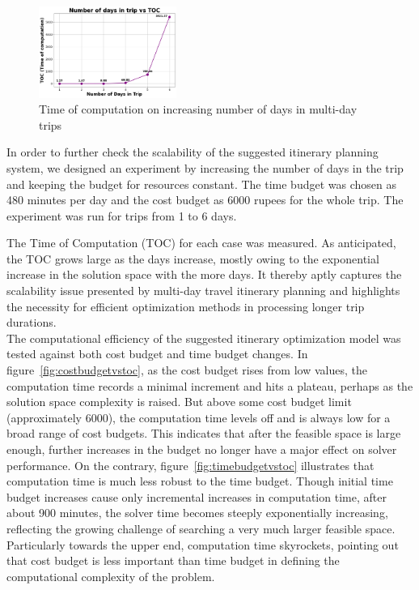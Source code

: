 \begin{figure}[th]
    \includegraphics[width=0.4\textwidth]{plots/multidayvstoc.png}
     \caption{Time of computation on increasing number of days in multi-day trips}
    \label{fig:scalability2}
\end{figure}

In order to further check the scalability of the suggested itinerary planning system, we designed an experiment by increasing the number of days in the trip and keeping the budget for resources constant. The time budget was chosen as 480 minutes per day and the cost budget as 6000 rupees for the whole trip. The experiment was run for trips from 1 to 6 days.

The Time of Computation (TOC) for each case was measured. As anticipated, the TOC grows large as the days increase, mostly owing to the exponential increase in the solution space with the more days. It thereby aptly captures the scalability issue presented by multi-day travel itinerary planning and highlights the necessity for efficient optimization methods in processing longer trip durations.\\

\noindent The computational efficiency of the suggested itinerary optimization model was tested against both cost budget and time budget changes. In figure~\ref{fig:costbudgetvstoc}, as the cost budget rises from low values, the computation time records a minimal increment and hits a plateau, perhaps as the solution space complexity is raised. But above some cost budget limit (approximately 6000), the computation time levels off and is always low for a broad range of cost budgets. This indicates that after the feasible space is large enough, further increases in the budget no longer have a major effect on solver performance. On the contrary, figure~\ref{fig:timebudgetvstoc} illustrates that computation time is much less robust to the time budget. Though initial time budget increases cause only incremental increases in computation time, after about 900 minutes, the solver time becomes steeply exponentially increasing, reflecting the growing challenge of searching a very much larger feasible space. Particularly towards the upper end, computation time skyrockets, pointing out that cost budget is less important than time budget in defining the computational complexity of the problem.

